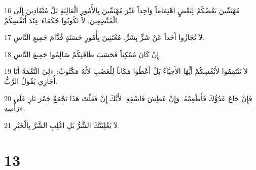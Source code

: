 \par 16 مُهْتَمِّينَ بَعْضُكُمْ لِبَعْضٍ اهْتِمَاماً وَاحِداً غَيْرَ مُهْتَمِّينَ بِالأُمُورِ الْعَالِيَةِ بَلْ مُنْقَادِينَ إِلَى الْمُتَّضِعِينَ. لاَ تَكُونُوا حُكَمَاءَ عِنْدَ أَنْفُسِكُمْ.
\par 17 لاَ تُجَازُوا أَحَداً عَنْ شَرٍّ بِشَرٍّ. مُعْتَنِينَ بِأُمُورٍ حَسَنَةٍ قُدَّامَ جَمِيعِ النَّاسِ.
\par 18 إِنْ كَانَ مُمْكِناً فَحَسَبَ طَاقَتِكُمْ سَالِمُوا جَمِيعَ النَّاسِ.
\par 19 لاَ تَنْتَقِمُوا لأَنْفُسِكُمْ أَيُّهَا الأَحِبَّاءُ بَلْ أَعْطُوا مَكَاناً لِلْغَضَبِ لأَنَّهُ مَكْتُوبٌ: «لِيَ النَّقْمَةُ أَنَا أُجَازِي يَقُولُ الرَّبُّ.
\par 20 فَإِنْ جَاعَ عَدُوُّكَ فَأَطْعِمْهُ. وَإِنْ عَطِشَ فَاسْقِهِ. لأَنَّكَ إِنْ فَعَلْتَ هَذَا تَجْمَعْ جَمْرَ نَارٍ عَلَى رَأْسِهِ».
\par 21 لاَ يَغْلِبَنَّكَ الشَّرُّ بَلِ اغْلِبِ الشَّرَّ بِالْخَيْرِ.

\chapter{13}

